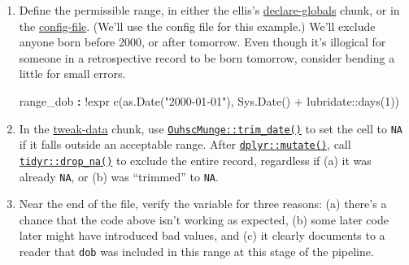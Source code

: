 \documentclass[
]{book}
\newenvironment{Shaded}{\begin{snugshade}}{\end{snugshade}}
\newcommand{\AttributeTok}[1]{\textcolor[rgb]{0.77,0.63,0.00}{#1}}
\newcommand{\DataTypeTok}[1]{\textcolor[rgb]{0.13,0.29,0.53}{#1}}
\newcommand{\DecValTok}[1]{\textcolor[rgb]{0.00,0.00,0.81}{#1}}
\newcommand{\FunctionTok}[1]{\textcolor[rgb]{0.00,0.00,0.00}{#1}}
\newcommand{\KeywordTok}[1]{\textcolor[rgb]{0.13,0.29,0.53}{\textbf{#1}}}
\newcommand{\NormalTok}[1]{#1}
\newcommand{\OperatorTok}[1]{\textcolor[rgb]{0.81,0.36,0.00}{\textbf{#1}}}
\newcommand{\StringTok}[1]{\textcolor[rgb]{0.31,0.60,0.02}{#1}}
\begin{document}
\begin{enumerate}
\def\labelenumi{\arabic{enumi}.}
\item
  Define the permissible range, in either the ellis's \protect\hyperlink{chunk-declare}{declare-globals} chunk, or in the \protect\hyperlink{repo-config}{config-file}. (We'll use the config file for this example.) We'll exclude anyone born before 2000, or after tomorrow. Even though it's illogical for someone in a retrospective record to be born tomorrow, consider bending a little for small errors.

\begin{Shaded}
\begin{Highlighting}[]
\FunctionTok{range\_dob   }\KeywordTok{:}\AttributeTok{ !expr c(as.Date("2000{-}01{-}01"), Sys.Date() + lubridate::days(1))}
\end{Highlighting}
\end{Shaded}
\item
  In the \protect\hyperlink{chunk-tweak-data}{tweak-data} chunk, use \href{https://ouhscbbmc.github.io/OuhscMunge/reference/trim.html}{\texttt{OuhscMunge::trim\_date()}} to set the cell to \texttt{NA} if it falls outside an acceptable range. After \href{https://dplyr.tidyverse.org/reference/mutate.html}{\texttt{dplyr::mutate()}}, call \href{https://tidyr.tidyverse.org/reference/drop_na.html}{\texttt{tidyr::drop\_na()}} to exclude the entire record, regardless if (a) it was already \texttt{NA}, or (b) was ``trimmed'' to \texttt{NA}.

\begin{Shaded}
\end{Shaded}
\item
  Near the end of the file, verify the variable for three reasons: (a) there's a chance that the code above isn't working as expected, (b) some later code later might have introduced bad values, and (c) it clearly documents to a reader that \texttt{dob} was included in this range at this stage of the pipeline.

\begin{Shaded}
\end{Shaded}
\end{enumerate}
\end{document}

